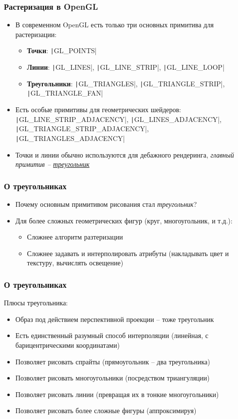 \documentclass[10pt]{beamer}
\begin{document}
\begin{frame}[fragile]
\frametitle{Растеризация в OpenGL}
\begin{itemize}
\item В современном OpenGL есть только три основных примитива для растеризации:
\pause
\begin{itemize}
\item \textbf{Точки}: \texttt|GL_POINTS|
\pause
\item \textbf{Линии}: \texttt|GL_LINES|, \texttt|GL_LINE_STRIP|, \texttt|GL_LINE_LOOP|
\pause
\item \textbf{Треугольники}: \texttt|GL_TRIANGLES|, \texttt|GL_TRIANGLE_STRIP|, \texttt|GL_TRIANGLE_FAN|
\end{itemize}
\pause
\item Есть особые примитивы для геометрических шейдеров: \texttt|GL_LINE_STRIP_ADJACENCY|, \texttt|GL_LINES_ADJACENCY|, \texttt|GL_TRIANGLE_STRIP_ADJACENCY|, \texttt|GL_TRIANGLES_ADJACENCY|
\pause
\item Точки и линии обычно используются для дебажного рендеринга, \textit{главный примитив -- \underline{треугольник}}
\end{itemize}
\end{frame}

\begin{frame}
\frametitle{О треугольниках}
\begin{itemize}
\item Почему основным примитивом рисования стал \textit{треугольник}?
\pause
\item Для более сложных геометрических фигур (круг, многоугольник, и т.д.):
\pause
\begin{itemize}
\item Сложнее алгоритм разтеризации
\pause
\item Сложнее задавать и интерполировать атрибуты (накладывать цвет и текстуру, вычислять освещение)
\end{itemize}
\end{itemize}
\end{frame}

\begin{frame}
\frametitle{О треугольниках}
Плюсы треугольника:
\pause
\begin{itemize}
\item Образ под действием перспективной проекции -- тоже треугольник
\pause
\item Есть единственный разумный способ интерполяции (линейная, с барицентрическими координатами)
\pause
\item Позволяет рисовать спрайты (прямоугольник -- два треугольника)
\pause
\item Позволяет рисовать многоугольники (посредством триангуляции)
\pause
\item Позволяет рисовать линии (превращая их в тонкие многоугольники)
\pause
\item Позволяет рисовать более сложные фигуры (аппроксимируя)
\end{itemize}
\end{frame}
\end{document}
